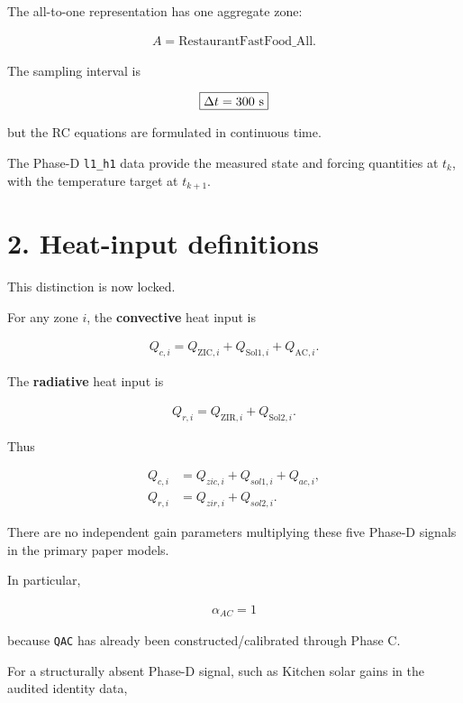 \documentclass[11pt]{article}
\begin{document}
The all-to-one representation has one aggregate zone:

\begin{align}
A=\text{RestaurantFastFood\_All}.
\end{align}

The sampling interval is

\begin{align}
\boxed{\Delta t=300\ {\rm s}}
\end{align}

but the RC equations are formulated in continuous time.

The Phase-D \texttt{l1\_h1} data provide the measured state and forcing quantities at \(t_k\), with the temperature target at \(t_{k+1}\).

\section*{2. Heat-input definitions}

This distinction is now locked.

For any zone \(i\), the \textbf{convective} heat input is

\begin{align}
\boxed{
Q_{c,i}
=
Q_{\mathrm{ZIC},i}
+
Q_{\mathrm{Sol1},i}
+
Q_{\mathrm{AC},i}.
}
\end{align}

The \textbf{radiative} heat input is

\begin{align}
\boxed{
Q_{r,i}
=
Q_{\mathrm{ZIR},i}
+
Q_{\mathrm{Sol2},i}.
}
\end{align}

Thus

\begin{align}
Q_{c,i}
&=
Q_{zic,i}+Q_{sol1,i}+Q_{ac,i},
\\
Q_{r,i}
&=
Q_{zir,i}+Q_{sol2,i}.
\end{align}

There are no independent gain parameters multiplying these five Phase-D signals in the primary paper models.

In particular,

\begin{align}
\boxed{\alpha_{AC}=1}
\end{align}

because \texttt{QAC} has already been constructed/calibrated through Phase C.

For a structurally absent Phase-D signal, such as Kitchen solar gains in the audited identity data,
\end{document}
